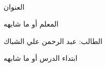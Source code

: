 \thispagestyle{empty}
\begin{center}
\\[4ex]
{\Huge
العنوان
\\ 
}


\vspace{11ex}

{\huge
    المعلم أو ما شابهه
}

\vspace{4ex}


\vspace{8ex}

{\Large
الطالب: عبد الرحمن علي الشباك
}

\vfill

{\Large
    ابتداء الدرس أو ما شابهه
}


\end{center}

\restoregeometry
\newpage
{\hypersetup{ 
linkcolor=black
}
\thispagestyle{empty}
\tableofcontents
\newpage
\setcounter{page}{1}
}

